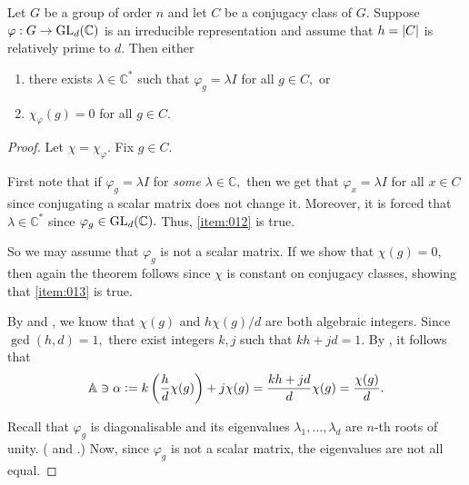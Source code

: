 \begin{thm} \label{thm:technicaltheoremgcd}
	Let $G$ be a group of order $n$ and let $C$ be a conjugacy class of $G.$ Suppose $\varphi : G \to \operatorname{GL}_d(\mathbb{C})$ is an irreducible representation and assume that $h = {\left\lvert C \right\lvert}$ is relatively prime to $d.$ Then either
	\begin{enumerate}
		\item \label{item:012} there exists $\lambda \in \mathbb{C}^*$ such that $\varphi_g = \lambda I$ for all $g \in C,$ or
		\item \label{item:013} $\chi_\varphi(g) = 0$ for all $g \in C.$
	\end{enumerate}
\end{thm}
\begin{proof} 
	Let $\chi = \chi_\varphi.$ Fix $g \in C.$

	First note that if $\varphi_g = \lambda I$ for \emph{some} $\lambda \in \mathbb{C},$ then we get that $\varphi_x = \lambda I$ for all $x \in C$ since conjugating a scalar matrix does not change it. Moreover, it is forced that $\lambda \in \mathbb{C}^*$ since $\varphi_g \in \operatorname{GL}_d(\mathbb{C}).$ Thus, \ref{item:012} is true.

	So we may assume that $\varphi_g$ is not a scalar matrix. If we show that $\chi(g) = 0,$ then again the theorem follows since $\chi$ is constant on conjugacy classes, showing that \ref{item:013} is true.

	By  and , we know that $\chi(g)$ and $h\chi(g)/d$ are both algebraic integers. Since $\gcd(h, d) = 1,$ there exist integers $k, j$ such that $kh + jd = 1.$ By , it follows that
	\begin{equation*} 
		\mathbb{A} \ni \alpha \vcentcolon= k\left(\frac{h}{d}\chi(g)\right) + j\chi(g) = \frac{kh + jd}{d}\chi(g) = \frac{\chi(g)}{d}.
	\end{equation*}
	
	Recall that $\varphi_g$ is diagonalisable and its eigenvalues $\lambda_1, \ldots, \lambda_d$ are $n$-th roots of unity. ( and .) Now, since $\varphi_g$ is not a scalar matrix, the eigenvalues are not all equal. 


\end{proof}
